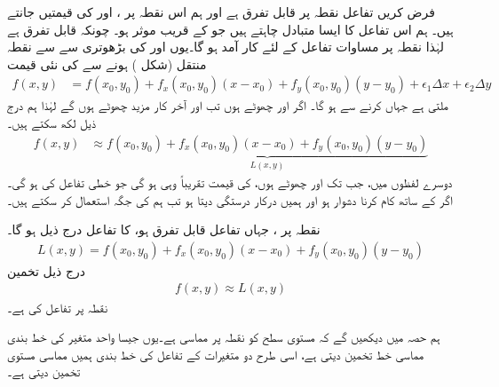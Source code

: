 فرض کریں   تفاعل  نقطہ  پر  قابل تفرق ہے  اور ہم اس نقطہ پر     ،  اور  کی  قیمتیں  جانتے ہیں۔ ہم  اس تفاعل کا ایسا متبادل  چاہتے ہیں جو      کے قریب  موثر ہو۔ چونکہ  قابل تفرق ہے لہٰذا نقطہ  پر مساوات   تفاعل  کے لئے کار آمد ہو گا۔یوں  اور  کی بڑھوتری  سے    سے نقطہ    منتقل  (شکل )    ہونے سے  کی نئی قیمت
\begin{align*}
f(x,y)&=f(x_0,y_0)+f_x(x_0,y_0)(x-x_0)+f_y(x_0,y_0)(y-y_0)+\epsilon_1\Delta x+\epsilon_2\Delta y
\end{align*}
ملتی ہے جہاں  کرنے سے  ہو گا۔ اگر  اور  چھوٹے ہوں تب  اور  آخر کار مزید چھوٹے ہوں گے لہٰذا ہم درج ذیل لکھ سکتے ہیں۔
\begin{align*}
f(x,y)&\approx \underbrace{f(x_0,y_0)+f_x(x_0,y_0)(x-x_0)+f_y(x_0,y_0)(y-y_0)}_{L(x,y)}
\end{align*}
دوسرے لفظوں میں، جب تک  اور  چھوٹے ہوں،  کی قیمت تقریباً وہی ہو گی جو خطی تفاعل  کی ہو گی۔ اگر  کے ساتھ کام کرنا دشوار ہو اور  ہمیں درکار درستگی دیتا ہو تب ہم  کی جگہ  استعمال کر سکتے ہیں۔

نقطہ پر  ،  جہاں تفاعل  قابل تفرق ہو،  کا تفاعل درج ذیل ہو گا۔
\begin{align}\label{مساوات_کثیرالمتغیر_خط_بند_تخمین}
L(x,y)=f(x_0,y_0)+f_x(x_0,y_0)(x-x_0)+f_y(x_0,y_0)(y-y_0)
\end{align}
درج ذیل  تخمین
\begin{align*}
f(x,y)\approx L(x,y)
\end{align*}
  نقطہ  پر تفاعل   کی  ہے۔ 

ہم  حصہ  میں دیکھیں گے کہ مستوی  سطح  کو  نقطہ  پر مماسی ہے۔یوں  جیسا واحد متغیر کی خط بندی مماسی خط تخمین دیتی ہے، اسی طرح  دو متغیرات کے تفاعل کی خط بندی ہمیں مماسی مستوی  تخمین دیتی ہے۔

